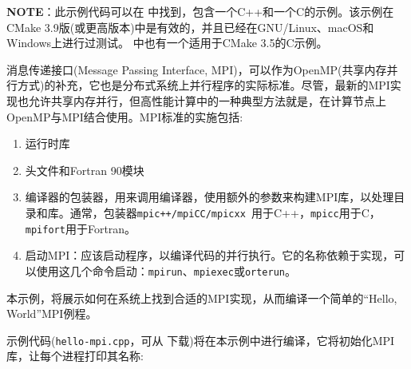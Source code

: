 \begin{myInfoBox}
\textbf{NOTE}：此示例代码可以在  中找到，包含一个C++和一个C的示例。该示例在CMake 3.9版(或更高版本)中是有效的，并且已经在GNU/Linux、macOS和Windows上进行过测试。 中也有一个适用于CMake 3.5的C示例。
\end{myInfoBox}

消息传递接口(Message Passing Interface, MPI)，可以作为OpenMP(共享内存并行方式)的补充，它也是分布式系统上并行程序的实际标准。尽管，最新的MPI实现也允许共享内存并行，但高性能计算中的一种典型方法就是，在计算节点上OpenMP与MPI结合使用。MPI标准的实施包括:

\begin{enumerate}
\item 运行时库

\item 头文件和Fortran 90模块

\item 编译器的包装器，用来调用编译器，使用额外的参数来构建MPI库，以处理目录和库。通常，包装器\texttt{mpic++/mpiCC/mpicxx }用于C++，\texttt{mpicc}用于C，\texttt{mpifort}用于Fortran。

\item 启动MPI：应该启动程序，以编译代码的并行执行。它的名称依赖于实现，可以使用这几个命令启动：\texttt{mpirun}、\texttt{mpiexec}或\texttt{orterun}。

\end{enumerate}

本示例，将展示如何在系统上找到合适的MPI实现，从而编译一个简单的“Hello, World”MPI例程。


示例代码(\texttt{hello-mpi.cpp}，可从 下载)将在本示例中进行编译，它将初始化MPI库，让每个进程打印其名称:


